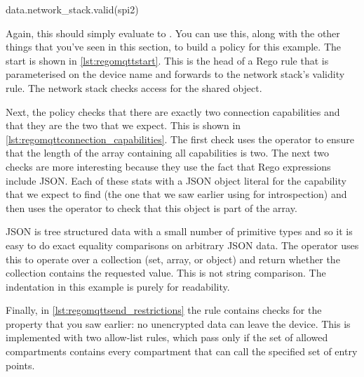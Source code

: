 \begin{regosnippet}
data.network_stack.valid(spi2)
\end{regosnippet}

Again, this should simply evaluate to .
You can use this, along with the other things that you've seen in this section, to build a policy for this example.
The start is shown in \ref{lst:regomqttstart}.
This is the head of a Rego rule that is parameterised on the device name and forwards to the network stack's validity rule.
The network stack checks access for the shared object.

\regolisting[filename=examples/mqtt/mqtt.rego,marker=network_stack,label=lst:regomqttstart,caption="The start of the Rego policy for the MQTT example."]{}

Next, the policy checks that there are exactly two connection capabilities and that they are the two that we expect.
This is shown in \ref{lst:regomqttconnection_capabilities}.
The first check uses the  operator to ensure that the length of the array containing all capabilities is two.
The next two checks are more interesting because they use the fact that Rego expressions include JSON.
Each of these stats with a JSON object literal for the capability that we expect to find (the one that we saw earlier using  for introspection) and then uses the  operator to check that this object is part of the array.

JSON is tree structured data with a small number of primitive types and so it is easy to do exact equality comparisons on arbitrary JSON data.
The  operator uses this to operate over a collection (set, array, or object) and return whether the collection contains the requested value.
This is not string comparison.
The indentation in this example is purely for readability.

\regolisting[filename=examples/mqtt/mqtt.rego,marker=connection_capabilities,label=lst:regomqttconnection_capabilities,caption="Rego rules for restricting output in the MQTT example."]{}

Finally, in \ref{lst:regomqttsend_restrictions} the rule contains checks for the property that you saw earlier: no unencrypted data can leave the device.
This is implemented with two allow-list rules, which pass only if the set of allowed compartments contains every compartment that can call the specified set of entry points.

\regolisting[filename=examples/mqtt/mqtt.rego,marker=send_restrictions,label=lst:regomqttsend_restrictions,caption="Rego rules to ensure that no data leaves the device unencrypted for the MQTT example."]{}

